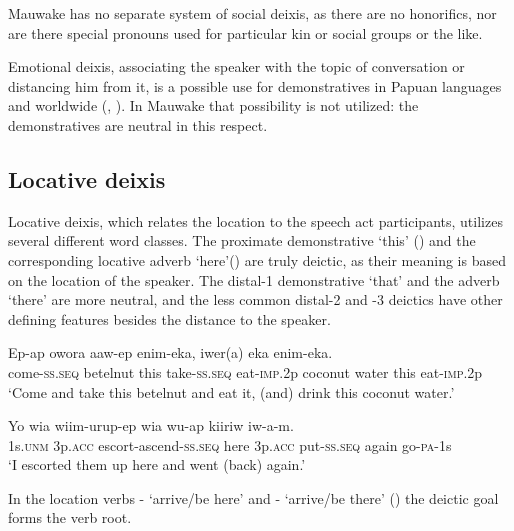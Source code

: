 Mauwake has no separate system of social deixis, as there are no honorifics, nor are there special pronouns used for particular kin or social groups or the like.

Emotional deixis, associating the speaker with the topic of conversation or distancing him from it, is a possible use for demonstratives in Papuan languages and worldwide (\citealt[72--78]{FarrEtAl1982}, \citealt[347--355]{Lakoff1974}). In Mauwake that possibility is not utilized: the demonstratives are neutral in this respect.

\subsection{Locative deixis} 
{}
Locative deixis, which relates the location to the speech act participants, utilizes several different word classes. The proximate demonstrative  `this' () and the corresponding locative adverb  `here'()  are truly deictic, as their meaning is based on the location of the speaker. The distal-1 demonstrative  `that' and the adverb  `there' are more neutral, and the less common distal-2 and -3 deictics have other defining features besides the distance to the speaker. 

\ea%
\label{ex:x1273}
\gll Ep-ap  owora    aaw-ep  enim-eka,  iwer(a)  eka   enim-eka. \\
come-\textsc{ss}.\textsc{seq}  betelnut  this  take-\textsc{ss}.\textsc{seq}  eat-\textsc{imp}.2p  coconut  water this  eat-\textsc{imp}.2p\\
\glt `Come and take this betelnut and eat it, (and) drink this coconut water.'
\z

\ea%
\label{ex:x1274}
\gll Yo  wia  wiim-urup-ep    wia  wu-ap kiiriw  iw-a-m.\\
1s.\textsc{unm}  3p.\textsc{acc}  escort-ascend-\textsc{ss}.\textsc{seq}  here  3p.\textsc{acc}  put-\textsc{ss}.\textsc{seq} again  go-\textsc{pa}-1s\\
\glt `I escorted them up here and went (back) again.'
\z

In the location verbs - `arrive/be here' and - `arrive/be there' () the deictic goal forms the verb root. 


